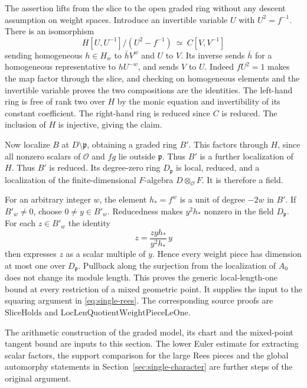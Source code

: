 The assertion lifts from the slice to the open graded ring without
any descent assumption on weight spaces. Introduce an invertible
variable \(U\) with \(U^2=f^{-1}\). There is an isomorphism
\[
 H[U,U^{-1}]/(U^2-f^{-1})\ \simeq\ C[V,V^{-1}]
\]
sending homogeneous \(h\in H_w\) to \(\bar h V^w\) and \(U\) to \(V\).
Its inverse sends \(\bar h\) for a homogeneous representative to
\(hU^{-w}\), and sends \(V\) to \(U\). Indeed \(fU^2=1\) makes
the map factor through the slice, and checking on homogeneous
elements and the invertible variable proves the two compositions
are the identities. The left-hand ring is free of rank two over
\(H\) by the monic equation and invertibility of its constant
coefficient. The right-hand ring is reduced since \(C\) is reduced.
The inclusion of \(H\) is injective, giving the claim.

Now localize \(B\) at \(D\setminus\mathfrak p\), obtaining a graded
ring \(B'\). This factors through \(H\), since all nonzero scalars
of \(\mathcal O\) and \(fg\) lie outside \(\mathfrak p\). Thus \(B'\) is a further localization of \(H\).
Thus \(B'\) is reduced. Its degree-zero ring \(D_{\mathfrak p}\)
is local, reduced, and a localization of the finite-dimensional
\(F\)-algebra \(D\otimes_{\mathcal O}F\). It is therefore a field.

For an arbitrary integer \(w\), the element \(h_*=f^w\) is a
unit of degree \(-2w\) in \(B'\). If \(B'_w\ne0\), choose
\(0\ne y\in B'_w\). Reducedness makes \(y^2 h_*\) nonzero in
the field \(D_{\mathfrak p}\). For each \(z\in B'_w\) the identity
\[
              z=\frac{zyh_*}{y^2 h_*}\,y
\]
then expresses \(z\) as a scalar multiple of \(y\). Hence every
weight piece has dimension at most one over \(D_{\mathfrak p}\).
Pullback along the surjection from the localization of \(A_0\)
does not change its module length. This proves the generic
local-length-one bound at every restriction of a mixed geometric
point. It supplies the input to the squaring argument in
\eqref{eq:single-rees}. The corresponding source proofs are
\(\mathrm{SliceHolds}\) and
\(\mathrm{LocLenQuotientWeightPieceLeOne}\).

The arithmetic construction of the graded model, its chart and the
mixed-point tangent bound are inputs to this section. The lower
Euler estimate for extracting scalar factors, the support comparison
for the large Rees pieces and the global automorphy statements in
Section~\ref{sec:single-character} are further steps of the original
argument.

